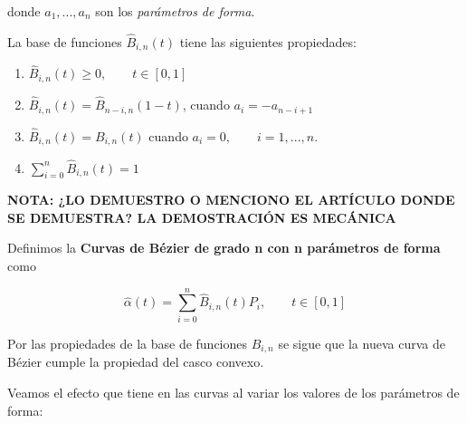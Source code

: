 \documentclass{article}
\begin{document}
donde $a_1,...,a_n$ son los \textit{parámetros de forma}. \newline

La base de funciones $\hat{B}_{i,n}(t)$ tiene las siguientes propiedades:
\begin{enumerate}
	\item $\hat{B}_{i,n}(t) \geq 0, \qquad t \in [0,1]$
	\item $\hat{B}_{i,n}(t) = \hat{B}_{n-i,n}(1-t)$, cuando $a_i = -a_{n-i+1}$
	\item $\hat{B}_{i,n}(t) = B_{i,n}(t)$ cuando $a_i = 0, \qquad i=1,...,n$.
	\item $\sum_{i=0}^{n}\hat{B}_{i,n}(t) = 1$
\end{enumerate}

\textbf{NOTA: ¿LO DEMUESTRO O MENCIONO EL ARTÍCULO DONDE SE DEMUESTRA? LA DEMOSTRACIÓN ES MECÁNICA}
\newline

Definimos la \textbf{Curvas de Bézier de grado n con n parámetros de forma} como

\begin{equation}
\hat{\alpha}(t) = \sum_{i=0}^{n}\hat{B}_{i,n}(t)P_i, \qquad t \in [0,1]
\end{equation}

Por las propiedades de la base de funciones $\hat{B}_{i,n}$ se sigue que la nueva curva de Bézier cumple la propiedad del casco convexo.
\newline

Veamos el efecto que tiene en las curvas al variar los valores de los parámetros de forma:
\end{document}
